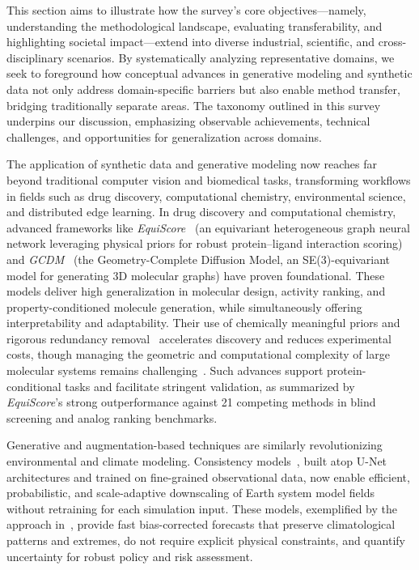 \documentclass[sigconf]{acmart}
\begin{document}
This section aims to illustrate how the survey’s core objectives—namely, understanding the methodological landscape, evaluating transferability, and highlighting societal impact—extend into diverse industrial, scientific, and cross-disciplinary scenarios. By systematically analyzing representative domains, we seek to foreground how conceptual advances in generative modeling and synthetic data not only address domain-specific barriers but also enable method transfer, bridging traditionally separate areas. The taxonomy outlined in this survey underpins our discussion, emphasizing observable achievements, technical challenges, and opportunities for generalization across domains.

The application of synthetic data and generative modeling now reaches far beyond traditional computer vision and biomedical tasks, transforming workflows in fields such as drug discovery, computational chemistry, environmental science, and distributed edge learning. In drug discovery and computational chemistry, advanced frameworks like \textit{EquiScore}~\cite{ref59} (an equivariant heterogeneous graph neural network leveraging physical priors for robust protein--ligand interaction scoring) and \textit{GCDM}~\cite{ref74} (the Geometry-Complete Diffusion Model, an SE(3)-equivariant model for generating 3D molecular graphs) have proven foundational. These models deliver high generalization in molecular design, activity ranking, and property-conditioned molecule generation, while simultaneously offering interpretability and adaptability. Their use of chemically meaningful priors and rigorous redundancy removal~\cite{ref59} accelerates discovery and reduces experimental costs, though managing the geometric and computational complexity of large molecular systems remains challenging~\cite{ref74}. Such advances support protein-conditional tasks and facilitate stringent validation, as summarized by \textit{EquiScore}'s strong outperformance against 21 competing methods in blind screening and analog ranking benchmarks.

Generative and augmentation-based techniques are similarly revolutionizing environmental and climate modeling. Consistency models~\cite{ref73}, built atop U-Net architectures and trained on fine-grained observational data, now enable efficient, probabilistic, and scale-adaptive downscaling of Earth system model fields without retraining for each simulation input. These models, exemplified by the approach in~\cite{ref73}, provide fast bias-corrected forecasts that preserve climatological patterns and extremes, do not require explicit physical constraints, and quantify uncertainty for robust policy and risk assessment.
\end{document}
